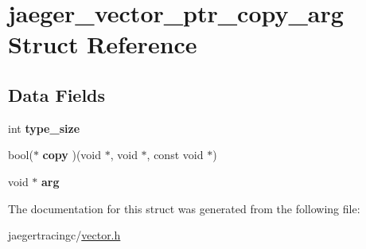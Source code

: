 \hypertarget{structjaeger__vector__ptr__copy__arg}{}\section{jaeger\+\_\+vector\+\_\+ptr\+\_\+copy\+\_\+arg Struct Reference}
\label{structjaeger__vector__ptr__copy__arg}
\subsection*{Data Fields}
\begin{DoxyCompactItemize}
\item 
\mbox{\label{structjaeger__vector__ptr__copy__arg_aed977cc7ae813bdfa78143413f9e039d}} 
int {\bfseries type\+\_\+size}
\item 
\mbox{\label{structjaeger__vector__ptr__copy__arg_a7cab7584436858ecf7fc34ec5f9ca52d}} 
bool($\ast$ {\bfseries copy} )(void $\ast$, void $\ast$, const void $\ast$)
\item 
\mbox{\label{structjaeger__vector__ptr__copy__arg_a4b53c466012f8254c794c5748d67e6f8}} 
void $\ast$ {\bfseries arg}
\end{DoxyCompactItemize}


The documentation for this struct was generated from the following file\+:\begin{DoxyCompactItemize}
\item 
jaegertracingc/\mbox{\hyperlink{vector_8h}{vector.\+h}}\end{DoxyCompactItemize}
